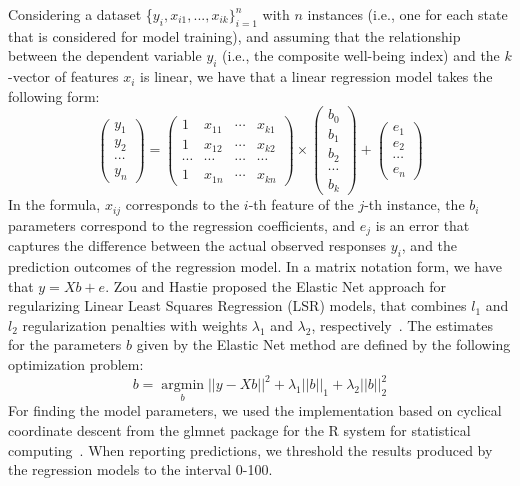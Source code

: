 \documentclass{acm_proc_article-sp}
\begin{document}
Considering a dataset \{${y_i, x_{i1},...,x_{ik}\}^n_{i=1}}$ with $n$ instances (i.e., one for each state that is considered for model training), and assuming that the relationship between the dependent variable $y_i$ (i.e., the composite well-being index) and the $k$-vector of features $x_i$ is linear, we have that a linear regression model takes the following form:
\begin{equation*}
\scriptstyle \begin{pmatrix}
y_1\\y_2\\\cdots\\y_n
\end{pmatrix} =
\begin{pmatrix}
1 & x_{11} & \cdots & x_{k1}\\
1 & x_{12} &  \cdots & x_{k2}\\
\cdots & \cdots & \cdots & \cdots\\
1 & x_{1n} & \cdots & x_{kn}
\end{pmatrix} \times
\begin{pmatrix}
b_0 \\ b_1 \\ b_2 \\ \cdots \\ b_k
\end{pmatrix} +
\begin{pmatrix}
e_1 \\ e_2 \\ \cdots \\ e_n
\end{pmatrix}
\end{equation*}
In the formula, $x_{ij}$ corresponds to the $i$-th feature of the $j$-th instance, the $b_i$ parameters correspond to the regression coefficients, and $e_j$ is an error that captures the difference between the actual observed responses $y_i$, and the prediction outcomes of the regression model. In a matrix notation form, we have that $y = Xb + e$. Zou and Hastie proposed the Elastic Net approach for regularizing Linear Least Squares Regression (LSR) models, that combines $l_1$ and $l_2$ regularization penalties with weights $\lambda_1$ and $\lambda_2$, respectively~\cite{elasticNet}. The estimates for the parameters $b$ given by the Elastic Net method are defined by the following optimization problem:
\begin{equation*}
b = \operatorname*{\arg\min}_b  ||y - Xb||^2 + \lambda_1||b||_1 + \lambda_2||b||_2^2
\end{equation*}
For finding the model parameters, we used the implementation based on cyclical coordinate descent from the glmnet package for the R system for statistical computing~\cite{elasticNet2}. When reporting predictions, we threshold the results produced by the regression models to the interval 0-100.
\end{document}
